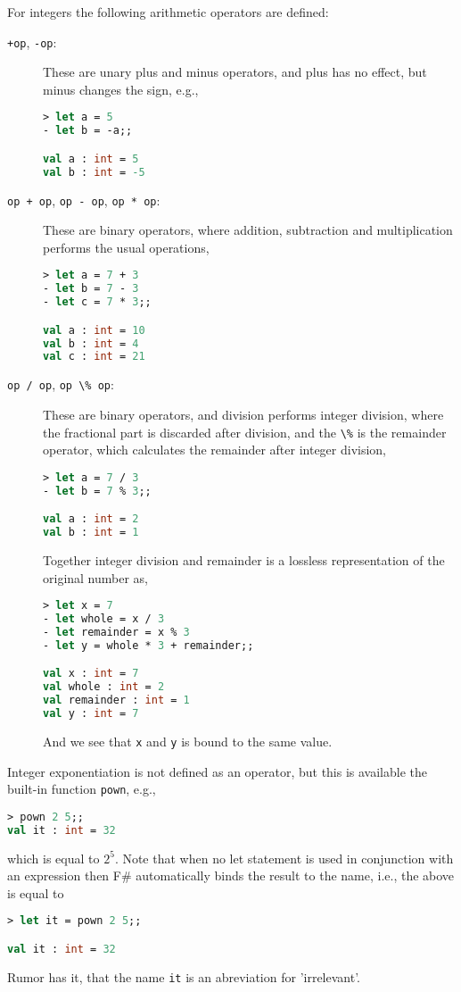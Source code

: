 For integers the following arithmetic operators are defined: 
\begin{description}
\item[\texttt{+op}, \texttt{-op}:] These are unary plus and minus operators, and plus has no effect, but minus changes the sign, e.g.,
\begin{lstlisting}[language=fsharp,caption={fsharpi}]
> let a = 5       
- let b = -a;;

val a : int = 5
val b : int = -5
\end{lstlisting}
\item[\lstinline|op + op|, \lstinline|op - op|, \lstinline|op * op|:] These are binary operators, where addition, subtraction and multiplication performs the usual operations, 
\begin{lstlisting}[language=fsharp,caption={fsharpi}]
> let a = 7 + 3
- let b = 7 - 3
- let c = 7 * 3;;

val a : int = 10
val b : int = 4
val c : int = 21
\end{lstlisting}
\item[\lstinline|op / op|, \lstinline|op \% op|:] These are binary operators, and division performs integer division, where the fractional part is discarded after division, and the \lstinline|\%| is the remainder operator, which calculates the remainder after integer division,
\begin{lstlisting}[language=fsharp,caption={fsharpi}]
> let a = 7 / 3
- let b = 7 % 3;;

val a : int = 2
val b : int = 1
\end{lstlisting}
Together integer division and remainder is a lossless representation of the original number as,
\begin{lstlisting}[language=fsharp,caption={fsharpi}]
> let x = 7
- let whole = x / 3
- let remainder = x % 3
- let y = whole * 3 + remainder;;

val x : int = 7
val whole : int = 2
val remainder : int = 1
val y : int = 7
\end{lstlisting}
And we see that \lstinline|x| and \lstinline|y| is bound to the same value.
\end{description}
Integer exponentiation is not defined as an operator, but this is available the built-in function \lstinline|pown|, e.g.,
\begin{lstlisting}[language=fsharp,caption={fsharpi}]
> pown 2 5;;
val it : int = 32
\end{lstlisting}
which is equal to $2^5$. Note that when no let statement is used in conjunction with an expression then F\# automatically binds the result to the  name, i.e., the above is equal to
\begin{lstlisting}[language=fsharp,caption={fsharpi}]
  > let it = pown 2 5;;

val it : int = 32
\end{lstlisting}
Rumor has it, that the name \lstinline|it| is an abreviation for 'irrelevant'.

